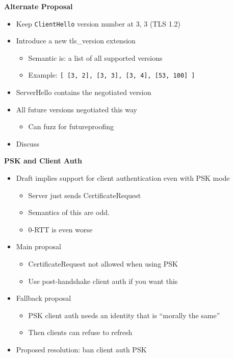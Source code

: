 \documentclass[helvetica]{seminar}
\newcommand{\heading}[1]{%
  \begin{center} 
    \large\bf 
    #1 
  \end{center} 
  \vspace{.4 in}}
\begin{document}
\begin{slide}
\heading{Alternate Proposal}

\begin{itemize}
\item Keep \verb^ClientHello^ version number at {3, 3} (TLS 1.2)

\item Introduce a new tls\_version extension
  \begin{itemize}
  \item Semantic is: a list of all supported versions
  \item Example: \verb^[ [3, 2], [3, 3], [3, 4], [53, 100] ]^
  \end{itemize}

\item ServerHello contains the negotiated version

\item All future versions negotiated this way
\begin{itemize}
\item Can fuzz for futureproofing
\end{itemize}

\item Discuss
\end{itemize}

\end{slide}


\begin{slide}
\heading{PSK and Client Auth}

\vspace{-4ex}
\begin{itemize}
\item Draft implies support for client authentication even with PSK mode
  \begin{itemize}
  \item Server just sends CertificateRequest
  \item Semantics of this are odd.
  \item 0-RTT is even worse
  \end{itemize}

\item Main proposal
  \begin{itemize}
  \item CertificateRequest not allowed when using PSK
  \item Use post-handshake client auth if you want this
  \end{itemize}

\item Fallback proposal
  \begin{itemize}
  \item PSK client auth needs an identity that is ``morally the same''
  \item Then clients can refuse to refresh
  \end{itemize}

\item Proposed resolution: ban client auth PSK
\end{itemize}

\end{slide}
\end{document}
